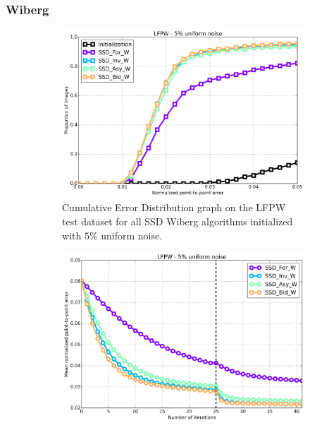\subsubsection*{Wiberg}

\begin{figure}[h!]
	\centering
	\begin{subfigure}{0.48\textwidth}
	    \includegraphics[width=\textwidth]{experiments/algorithms/ssd_w/ced_ssd_w_5.png}
	    \caption{Cumulative Error Distribution graph on the LFPW test dataset for all SSD Wiberg algorithms initialized with $5\%$ uniform noise.}
	    \label{fig:ced_ssd_w_5}
	\end{subfigure}
	\hfill
	\begin{subfigure}{0.48\textwidth}
	    \includegraphics[width=\textwidth]{experiments/algorithms/ssd_w/mean_error_vs_iters_ssd_w_5.png}

\end{subfigure}
\end{figure}
